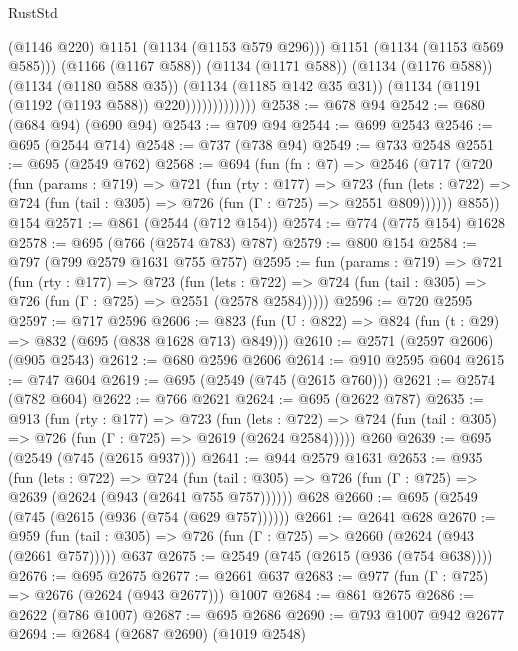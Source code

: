 \begin{lexlean}{RustStd}
\begin{coremodule}
{\begin{coremodule}
{{{{{{{{{                              (@1146 @220)
                              @1151
                              (@1134 (@1153 @579 @296)))
                            @1151
                            (@1134 (@1153 @569 @585)))
                          (@1166 (@1167 @588))
                          (@1134 (@1171 @588))
                          (@1134 (@1176 @588))
                          (@1134 (@1180 @588 @35))
                          (@1134 (@1185 @142 @35 @31))
                          (@1134 (@1191 (@1192 (@1193 @588)) @220)))))))))))))
@2538 := @678 @94
@2542 := @680 (@684 @94) (@690 @94)
@2543 := @709 @94
@2544 := @699 @2543
@2546 := @695 (@2544 @714)
@2548 := @737 (@738 @94)
@2549 := @733 @2548
@2551 := @695 (@2549 @762)
@2568 := @694
    (fun (fn : @7) =>
    @2546
      (@717
        (@720
          (fun (params : @719) =>
          @721
            (fun (rty : @177) =>
            @723
              (fun (lets : @722) =>
              @724 (fun (tail : @305) => @726 (fun (Γ : @725) => @2551 @809))))))
        @855))
    @154
@2571 := @861 (@2544 (@712 @154))
@2574 := @774 (@775 @154) @1628
@2578 := @695 (@766 (@2574 @783) @787)
@2579 := @800 @154
@2584 := @797 (@799 @2579 @1631 @755 @757)
@2595 := fun (params : @719) =>
  @721
    (fun (rty : @177) =>
    @723
      (fun (lets : @722) =>
      @724 (fun (tail : @305) => @726 (fun (Γ : @725) => @2551 (@2578 @2584)))))
@2596 := @720 @2595
@2597 := @717 @2596
@2606 := @823 (fun (U : @822) => @824 (fun (t : @29) => @832 (@695 (@838 @1628 @713) @849)))
@2610 := @2571 (@2597 @2606) (@905 @2543)
@2612 := @680 @2596 @2606
@2614 := @910 @2595 @604
@2615 := @747 @604
@2619 := @695 (@2549 (@745 (@2615 @760)))
@2621 := @2574 (@782 @604)
@2622 := @766 @2621
@2624 := @695 (@2622 @787)
@2635 := @913
    (fun (rty : @177) =>
    @723
      (fun (lets : @722) =>
      @724 (fun (tail : @305) => @726 (fun (Γ : @725) => @2619 (@2624 @2584)))))
    @260
@2639 := @695 (@2549 (@745 (@2615 @937)))
@2641 := @944 @2579 @1631
@2653 := @935
    (fun (lets : @722) =>
    @724 (fun (tail : @305) => @726 (fun (Γ : @725) => @2639 (@2624 (@943 (@2641 @755 @757))))))
    @628
@2660 := @695 (@2549 (@745 (@2615 (@936 (@754 (@629 @757))))))
@2661 := @2641 @628
@2670 := @959 (fun (tail : @305) => @726 (fun (Γ : @725) => @2660 (@2624 (@943 (@2661 @757))))) @637
@2675 := @2549 (@745 (@2615 (@936 (@754 @638))))
@2676 := @695 @2675
@2677 := @2661 @637
@2683 := @977 (fun (Γ : @725) => @2676 (@2624 (@943 @2677))) @1007
@2684 := @861 @2675
@2686 := @2622 (@786 @1007)
@2687 := @695 @2686
@2690 := @793 @1007 @942 @2677
@2694 := @2684 (@2687 @2690) (@1019 @2548)
}}}}}}}}}
\end{coremodule}}
\end{coremodule}
\end{lexlean}

